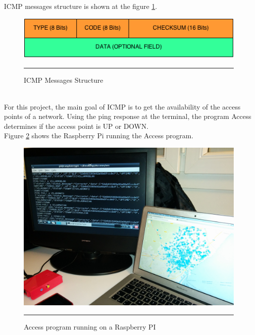 \documentclass[12pt, a4paper,twoside]{tesi_upf}
\begin{document}
            ICMP messages structure is shown at the figure \ref{fig:ICMP}.
            
            
        \begin{figure}[htbp]
          \centering
              \includegraphics[scale=0.7]{./figures/ICMP.png}
              \rule{32em}{0.5pt}
          \caption[ICMP Messages Structure]{ICMP Messages Structure}
          \label{fig:ICMP}
        \end{figure}

        \\
       
       For this project, the main goal of ICMP is to get the availability of the access points of a network. Using the ping response at the terminal, the program Access determines if the access point is UP or DOWN.\\
        
        Figure \ref{fig:Rasprun} shows the Raspberry Pi running the Access program.
        
        \begin{figure}[htbp]
          \centering
              \includegraphics[scale=0.12]{./figures/RaspRun.jpg}
              \rule{32em}{0.5pt}
          \caption[Access program running on a Raspberry PI]{Access program running on a Raspberry PI}
          \label{fig:Rasprun}
        \end{figure}
\end{document}
